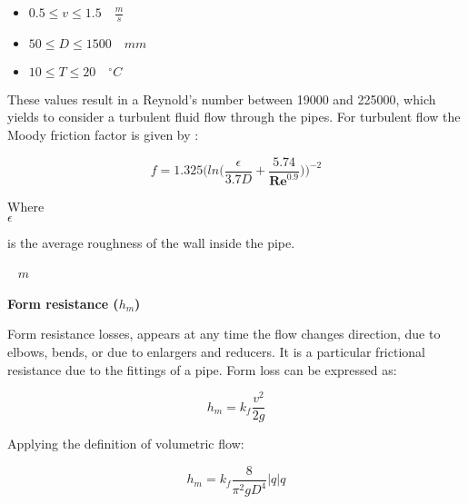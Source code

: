 \begin{itemize}
  \item $0.5 \leq v \leq 1.5  \quad \frac{m}{s}$
  \item $50 \leq D \leq 1500\quad mm$
  \item $10 \leq T \leq 20 \quad ^{\circ} C$
\end{itemize}

These values result in a Reynold's number between 19000 and 225000, which yields to consider a turbulent fluid flow through the pipes. For turbulent flow the 
Moody friction factor is given by \cite{Design_Water}: 

\begin{equation}
  f = 1.325 \bigg(ln\bigg(\frac{\epsilon}{3.7 D}+\frac{5.74}{\pmb{Re}^{0.9}}\bigg)\bigg)^{-2}
  \label{turbulent}
\end{equation}

\begin{minipage}[t]{0.20\textwidth}
Where\\
\hspace*{8mm} $\epsilon$ 
\end{minipage}
\begin{minipage}[t]{0.68\textwidth}
\vspace*{2mm}
is the average roughness of the wall inside the pipe.
 \end{minipage}
\begin{minipage}[t]{0.10\textwidth}
\vspace*{2mm}
\textcolor{White}{te}$\unit{m}$
\end{minipage}

%
\textbf{Form resistance (\texorpdfstring{$h_m$}{})} 
\label{FormResistance}

Form resistance losses, appears at any time the flow changes direction, due to elbows, bends,
or due to enlargers and reducers. It is a particular frictional resistance due to the 
fittings of a pipe. Form loss can be expressed as: 

\begin{equation}
  h_m = k_f \frac{v^2}{2g}
\end{equation}


Applying the definition of volumetric flow:

\begin{equation}
   h_m = k_f \frac{8}{\pi^2gD^4}  |q| q
\label{Formloss}
\end{equation}

